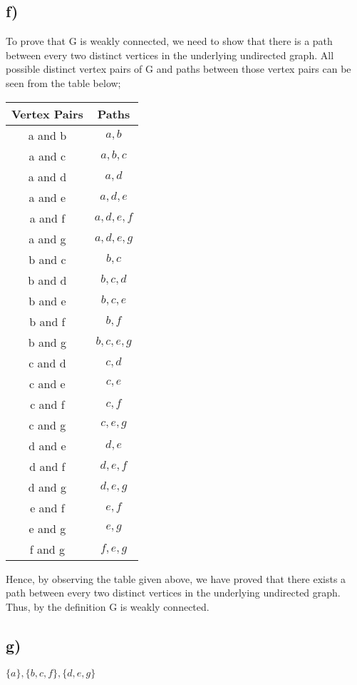 \documentclass[11pt]{article}
\begin{document}
\subsection*{f)}
To prove that G is weakly connected, we need to show that there is a path between every two distinct vertices in the underlying undirected graph. All possible distinct vertex pairs of G and paths between those vertex pairs can be seen from the table below; \\
\begin{table}[H]
	\centering
	\vspace{5px}
	\begin{tabular}{|c|c|}
		\hline
		Vertex Pairs & Paths  \\ \hline
		a and b&$a,b$\\ \hline
		a and c&$a,b,c$\\ \hline
		a and d&$a,d$\\ \hline
		a and e&$a,d,e$\\ \hline
		a and f&$a,d,e,f$\\ \hline
		a and g&$a,d,e,g$\\ \hline
		b and c&$b,c$\\ \hline
		b and d&$b,c,d$\\ \hline
		b and e&$b,c,e$\\ \hline
		b and f&$b,f$\\ \hline
		b and g&$b,c,e,g$\\ \hline
		c and d&$c,d$\\ \hline
		c and e&$c,e$\\ \hline
		c and f&$c,f$\\ \hline
		c and g&$c,e,g$\\ \hline
		d and e&$d,e$\\ \hline
		d and f&$d,e,f$\\ \hline
		d and g&$d,e,g$\\ \hline
		e and f&$e,f$\\ \hline
		e and g&$e,g$\\ \hline
		f and g&$f,e,g$\\ \hline
	\end{tabular}
\end{table}  
Hence, by observing the table given above, we have proved that there exists a path between every two distinct vertices in the underlying undirected graph. Thus, by the definition G is weakly connected.

\subsection*{g)}
$\{a\}, \{b,c,f\}, \{d,e,g\}$
\end{document}
